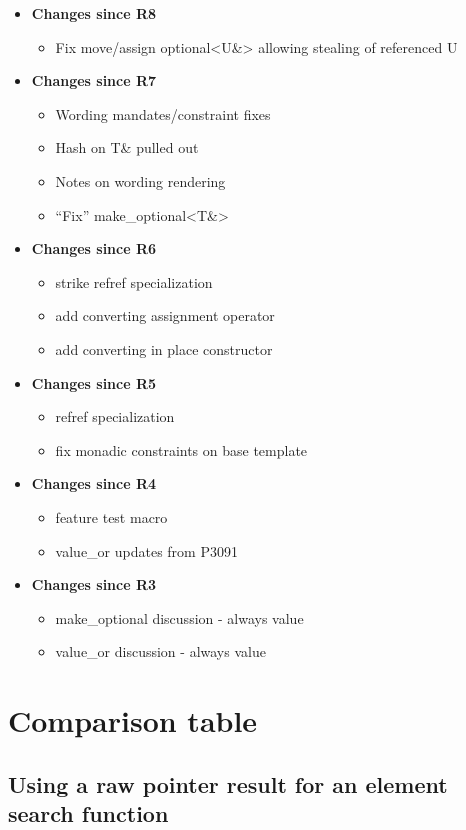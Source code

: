 \documentclass[a4paper,10pt,oneside,openany,final,article]{memoir}
\begin{document}
\begin{itemize}
\item \textbf{Changes since R8}
  \begin{itemize}
  \item Fix move/assign optional<U\&> allowing stealing of referenced U
  \end{itemize}
\item \textbf{Changes since R7}
  \begin{itemize}
  \item Wording mandates/constraint fixes
  \item Hash on T\& pulled out
  \item Notes on wording rendering
  \item ``Fix'' make_optional<T\&>
  \end{itemize}
\item \textbf{Changes since R6}
  \begin{itemize}
  \item strike refref specialization
  \item add converting assignment operator
  \item add converting in place constructor
  \end{itemize}
\item \textbf{Changes since R5}
  \begin{itemize}
  \item refref specialization
  \item fix monadic constraints on base template
  \end{itemize}
\item \textbf{Changes since R4}
  \begin{itemize}
  \item feature test macro
  \item value_or updates from P3091
  \end{itemize}
\item \textbf{Changes since R3}
  \begin{itemize}
  \item make_optional discussion - always value
  \item value_or discussion - always value
  \end{itemize}
\end{itemize}

\chapter{Comparison table}
\section{Using a raw pointer result for an element search function}
\end{document}
